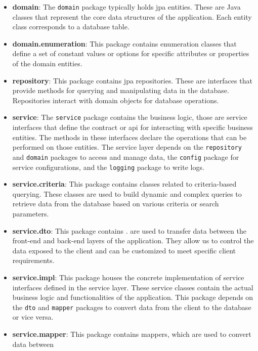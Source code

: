 \begin{itemize}
    \item \textbf{domain}: The \texttt{domain} package typically holds \acrshort{jpa} entities. These are
          Java classes that represent the core data structures of the application. Each entity
          class corresponds to a database table.
    \item \textbf{domain.enumeration}: This package contains enumeration classes that define a set
          of constant values or options for specific attributes or properties of the domain
          entities.
    \item \textbf{repository}: This package contains \acrshort{jpa} repositories. These are interfaces that
          provide methods for querying and manipulating data in the database. Repositories interact with
          domain objects for database operations.
    \item \textbf{service}: The \texttt{service} package contains the business logic, those are service interfaces that
          define the contract or \acrshort{api} for interacting with specific business entities. The methods
          in these interfaces declare the operations that can be performed on those entities.
          The service layer depends on the \texttt{repository} and \texttt{domain} packages to access and
          manage data, the \texttt{config} package for service configurations, and the \texttt{logging}
          package to write logs.
    \item \textbf{service.criteria}: This package contains classes related to criteria-based querying.
          These classes are used to build dynamic and complex queries to retrieve data from the
          database based on various criteria or search parameters.
    \item \textbf{service.dto}: This package contains .  are used to transfer
          data between the front-end and back-end layers of the application. They allow us to control
          the data exposed to the client and can be customized to meet specific client requirements.
    \item \textbf{service.impl}: This package houses the concrete implementation of service interfaces
          defined in the service layer. These service classes contain the actual business logic
          and functionalities of the application. This package depends on the \texttt{dto} and \texttt{mapper}
          packages to convert data from the client to the database or vice versa.
    \item \textbf{service.mapper}: This package contains mappers, which are used to convert data between

\end{itemize}
